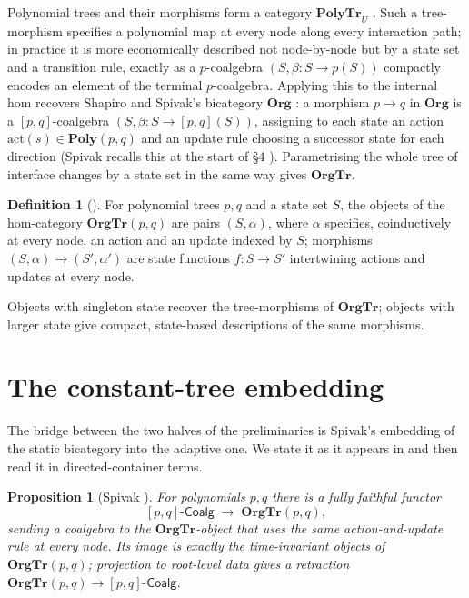 \documentclass[11pt]{amsart}
\newtheorem{proposition}[theorem]{Proposition}
\theoremstyle{definition}
\newtheorem{definition}[theorem]{Definition}
\theoremstyle{remark}
\newcommand{\Poly}{\mathbf{Poly}}
\newcommand{\OrgTr}{\mathbf{OrgTr}}
\newcommand{\Org}{\mathbf{Org}}
\newcommand{\Coalg}{\text{-}\mathsf{Coalg}}
\begin{document}
Polynomial trees and their morphisms form a category $\mathbf{PolyTr}_U$
\cite[Prop.~3.8]{SpivakOrgTr}. Such a tree-morphism specifies a polynomial map at every
node along every interaction path; in practice it is more economically described not
node-by-node but by a state set and a transition rule,
exactly as a $p$-coalgebra $(S,\beta\colon S\to p(S))$ compactly encodes an element of the
terminal $p$-coalgebra. Applying this to the internal hom recovers Shapiro and Spivak's
bicategory $\Org$ \cite{ShapiroSpivak}: a morphism $p\to q$ in $\Org$ is a
$[p,q]$-coalgebra $(S,\beta\colon S\to[p,q](S))$, assigning to each state an action
$\mathrm{act}(s)\in\Poly(p,q)$ and an update rule choosing a successor state for each
direction (Spivak recalls this at the start of \S4 \cite{SpivakOrgTr}). Parametrising the
whole tree of interface changes by a state set in the same way gives $\OrgTr$.

\begin{definition}[{\cite[Def.~4.1--4.2]{SpivakOrgTr}}]\label{def:orgtr}
For polynomial trees $p,q$ and a state set $S$, the objects of the hom-category
$\OrgTr(p,q)$ are pairs $(S,\alpha)$, where $\alpha$ specifies, coinductively at every
node, an action and an update indexed by $S$; morphisms $(S,\alpha)\to(S',\alpha')$ are
state functions $f\colon S\to S'$ intertwining actions and updates at every node.
\end{definition}

Objects with singleton state recover the tree-morphisms of $\OrgTr$; objects with larger
state give compact, state-based descriptions of the same morphisms.

\section{The constant-tree embedding}\label{sec:embedding}

The bridge between the two halves of the preliminaries is Spivak's embedding of the static
bicategory into the adaptive one. We state it as it appears in \cite{SpivakOrgTr} and then
read it in directed-container terms.

\begin{proposition}[Spivak {\cite[Prop.~4.6, Rem.~4.7]{SpivakOrgTr}}]\label{prop:ff}
For polynomials $p,q$ there is a fully faithful functor
\[
  [p,q]\Coalg \;\longrightarrow\; \OrgTr(p,q),
\]
sending a coalgebra to the $\OrgTr$-object that uses the \emph{same} action-and-update rule
at every node. Its image is exactly the \emph{time-invariant} objects of $\OrgTr(p,q)$;
projection to root-level data gives a retraction $\OrgTr(p,q)\to[p,q]\Coalg$.
\end{proposition}
\end{document}
